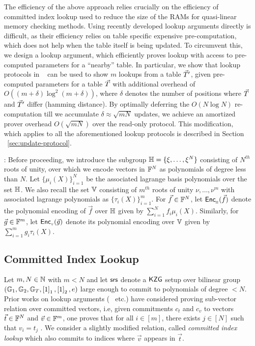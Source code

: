 The efficiency of the above approach relies crucially on the efficiency of committed index lookup used to
reduce the size of the RAMs for quasi-linear memory checking methods.
Using recently developed lookup arguments directly is difficult, as their efficiency relies on
table specific expensive pre-computation, which does not help when the table itself is being updated.
To circumvent this, we design a lookup argument, which efficiently proves lookup with access to pre-computed
parameters for a ``nearby'' table. In particular, we show that lookup protocols in
~\cite{CCS:ZBKMNS22,EPRINT:PosKat22,EPRINT:EagFioGab22} can be used to show $m$ lookups from a table $\vec{T}'$, given pre-computed parameters
for a table $\vec{T}$ with additional overhead of $O((m+\delta)\log^2 (m+\delta))$, where $\delta$ denotes the number of positions where
$\vec{T}$ and $\vec{T}'$ differ (hamming distance). By optimally deferring the $O(N\log N)$ re-computation till we
accumulate $\delta \approx \sqrt{mN}$ updates, we achieve an amortized prover overhead $O(\sqrt{mN})$ over the read-only protocol.
This modification, which applies to all the aforementioned lookup protocols is described in Section ~\ref{sec:update-protocol}.

:
Before proceeding, we introduce the subgroup $\mathbb{H}=\{\xi,\ldots,\xi^N\}$ consisting of $N^{th}$ roots of unity,
over which we encode vectors in $\mathbb{F}^N$ as polynomials of degree less than $N$. Let $\{\mu_i(X)\}_{i=1}^N$ be the associated
lagrange basis polynomials over the set $\mathbb{H}$. We also recall the set $\mathbb{V}$ consisting of $m^{th}$ roots of unity
$\nu,\ldots,\nu^m$ with associated lagrange polynomials as $\{\tau_i(X)\}_{i=1}^m$. For $\vec{f}\in \mathbb{F}^N$, let
$\mathsf{Enc}_{{}_{\mathbb{H}}}(\vec{f})$ denote the polynomial encoding of $\vec{f}$ over $\mathbb{H}$ given by $\sum_{i=1}^N f_i\mu_i(X)$. Similarly,
for $\vec{g}\in \mathbb{F}^m$, let $\mathsf{Enc}_{{}_{\mathbb{V}}}(\vec{g})$ denote its polynomial encoding over $\mathbb{V}$ given by $\sum_{i=1}^m g_i\tau_i(X)$.


\subsection{Committed Index Lookup}\label{subsec:committed-index-lookup}
Let $m,N\in \mathbb{N}$ with $m < N$ and let $\mathsf{srs}$ denote a $\mathsf{KZG}$ setup over bilinear group $(\mathbb{G}_1,\mathbb{G}_2,\mathbb{G}_T,\left[{1}\right]_1,\left[{1}\right]_2,e)$
large enough to commit to polynomials of degree $<N$. Prior works on lookup arguments (~\cite{CCS:ZBKMNS22,EPRINT:PosKat22} etc.)
have considered proving sub-vector relation over committed vectors, i.e, given commitments $c_t$ and $c_v$ to vectors $\vec{t}\in \mathbb{F}^N$
and $\vec{v}\in \mathbb{F}^m$, one proves that for all $i\in [m]$, there exists $j\in [N]$ such that $v_i=t_j$ .
We consider a slightly modified relation,
called {\em committed index lookup}  which also commits to indices where $\vec{v}$ appears in $\vec{t}$.

